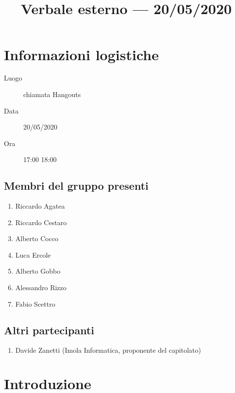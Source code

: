 \documentclass{article}
\title{Verbale esterno --- 20/05/2020}
\begin{document}


\section{Informazioni logistiche}%
\label{sec:informazioni_logistiche}

\begin{description}
  \item [Luogo] chiamata Hangouts
  \item [Data] 20/05/2020
  \item [Ora] 17:00  18:00
\end{description}

\subsection{Membri del gruppo presenti}%
\label{sub:membri_del_gruppo_presenti}

\begin{enumerate}
  \item Riccardo Agatea
  \item Riccardo Cestaro
  \item Alberto Cocco
  \item Luca Ercole
  \item Alberto Gobbo
  \item Alessandro Rizzo
  \item Fabio Scettro
\end{enumerate}


\subsection{Altri partecipanti}%
\label{sub:altri_partecipanti}

\begin{enumerate}
  \item Davide Zanetti (Imola Informatica, proponente del capitolato)
\end{enumerate}


\section{Introduzione}%
\label{sec:introduzione}
\end{document}
